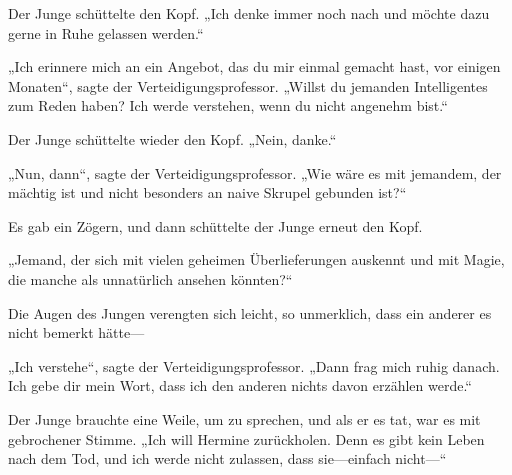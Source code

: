Der Junge schüttelte den Kopf.
„Ich denke immer noch nach und möchte dazu gerne in Ruhe gelassen werden.“

„Ich erinnere mich an ein Angebot, das du mir einmal gemacht hast, vor einigen Monaten“, sagte der Verteidigungsprofessor. „Willst du jemanden Intelligentes zum Reden haben? Ich werde verstehen, wenn du nicht angenehm bist.“

Der Junge schüttelte wieder den Kopf.
„Nein, danke.“

„Nun, dann“, sagte der Verteidigungsprofessor. „Wie wäre es mit jemandem, der mächtig ist und nicht besonders an naive Skrupel gebunden ist?“

Es gab ein Zögern, und dann schüttelte der Junge erneut den Kopf.

„Jemand, der sich mit vielen geheimen Überlieferungen auskennt und mit Magie, die manche als unnatürlich ansehen könnten?“

Die Augen des Jungen verengten sich leicht, so unmerklich, dass ein anderer es nicht bemerkt hätte—

„Ich verstehe“, sagte der Verteidigungsprofessor. „Dann frag mich ruhig danach. Ich gebe dir mein Wort, dass ich den anderen nichts davon erzählen werde.“


Der Junge brauchte eine Weile, um zu sprechen, und als er es tat, war es mit gebrochener Stimme. „Ich will Hermine zurückholen. Denn es gibt kein Leben nach dem Tod, und ich werde nicht zulassen, dass sie—einfach nicht—“


